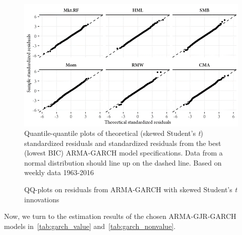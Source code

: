 \begin{figure}[H]
  \caption{QQ-plots on residuals from ARMA-GARCH with skewed Student's \textit{t} innovations}
  \label{fig:qq_ghst}
  \centering
  \begin{minipage}{\textwidth}
  \includegraphics[scale=1]{graphics/qq_ghst.png}  
  \vspace{3mm}
  \footnotesize
  Quantile-quantile plots of theoretical (skewed Student's \textit{t}) standardized residuals and standardized residuals from the best (lowest BIC) ARMA-GARCH model specifications. Data from a normal distribution should line up on the dashed line. Based on weekly data 1963-2016
  \end{minipage}
\end{figure}

Now, we turn to the estimation results of the chosen ARMA-GJR-GARCH models in~\autoref{tab:garch_value} and~\autoref{tab:garch_nonvalue}. 

